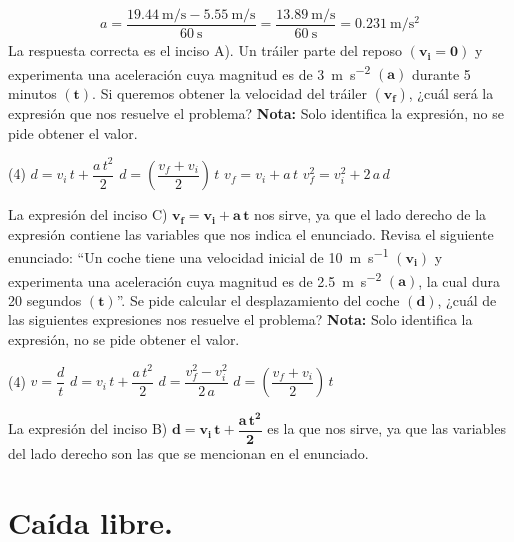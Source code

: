 \documentclass[12pt, letter]{exam}
\begin{document}
\begin{questions}
\begin{align*}
    a = \dfrac{\displaystyle \SI[per-mode=fraction]{19.44}{\meter\per\second} - \SI[per-mode=fraction]{5.55}{\meter\per\second}}{\SI{60}{\second}} = \dfrac{\displaystyle \SI[per-mode=fraction]{13.89}{\meter\per\second}}{\SI{60}{\second}} = \SI[per-mode=fraction]{0.231}{\meter\per\square\second}
    \end{align*}
    La respuesta correcta es el inciso A).
    \question Un tráiler parte del reposo $\mathbf{(v_{i} = 0)}$ y experimenta una aceleración cuya magnitud es de \SI{3}{\meter\per\square\second} $\mathbf{(a)}$ durante \num{5} minutos $\mathbf{(t)}$. Si queremos obtener la velocidad del tráiler $\mathbf{(v_{f})}$, ¿cuál será la expresión que nos resuelve el problema? \textbf{Nota: } Solo identifica la expresión, no se pide obtener el valor.
    \begin{tasks}(4)
        \task $d = v_{i} \, t + \dfrac{a \, t^{2}}{2}$
        \task $d = \left( \dfrac{v_{f} + v_{i}}{2} \right) \, t$
        \task $v_{f} = v_{i} + a \, t$
        \task $v_{f}^{2} = v_{i}^{2} + 2\, a \, d$
    \end{tasks}
    La expresión del inciso C) $\mathbf{v_{f} = v_{i} + a \, t}$ nos sirve, ya que el lado derecho de la expresión contiene las variables que nos indica el enunciado.
    \question Revisa el siguiente enunciado: \enquote{Un coche tiene una velocidad inicial de \SI{10}{\meter\per\second} $\mathbf{(v_{i})}$ y experimenta una aceleración cuya magnitud es de \SI{2.5}{\meter\per\square\second} $\mathbf{(a)}$, la cual dura \num{20} segundos $\mathbf{(t)}$}. Se pide calcular el desplazamiento del coche $\mathbf{(d)}$, ¿cuál de las siguientes expresiones nos resuelve el problema? \textbf{Nota: } Solo identifica la expresión, no se pide obtener el valor.
    \begin{tasks}(4)
        \task $v = \dfrac{d}{t}$
        \task $d = v_{i} \, t + \dfrac{a \, t^{2}}{2}$
        \task $d = \dfrac{v_{f}^{2} - v_{i}^{2}}{2 \, a}$
        \task $d = \left( \dfrac{v_{f} + v_{i}}{2} \right) \, t$
    \end{tasks}
    La expresión del inciso B) $\mathbf{d = v_{i} \, t + \dfrac{a \, t^{2}}{2}}$ es la que nos sirve, ya que las variables del lado derecho son las que se mencionan en el enunciado.

    \section{Caída libre.}
    

\end{questions}
\end{document}
